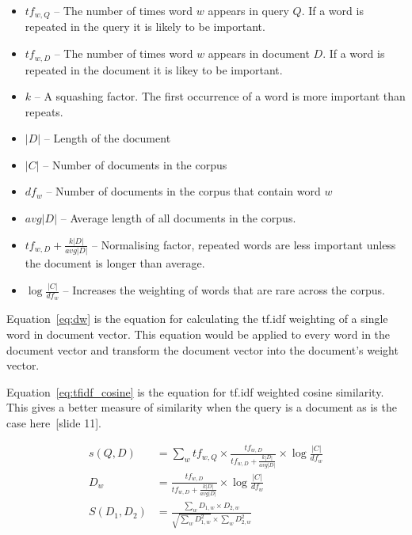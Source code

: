 \begin{itemize}
    \item $tf_{w,Q}$ -- The number of times word $w$ appears in query $Q$.  If a word is repeated in the query it is likely to be important.
    \item $tf_{w,D}$ -- The number of times word $w$ appears in document $D$.  If a word is repeated in the document it is likey to be important.
    \item $k$ -- A squashing factor.  The first occurrence of a word is more important than repeats.
    \item $|D|$ -- Length of the document
    \item $|C|$ -- Number of documents in the corpus
    \item $df_{w}$ -- Number of documents in the corpus that contain word $w$
    \item $avg|D|$ -- Average length of all documents in the corpus.
    \item $tf_{w,D} + \frac{k|D|}{avg|D|}$ -- Normalising factor, repeated words are less important unless the document is longer than average.
    \item $\log \frac{|C|}{df_{w}}$ -- Increases the weighting of words that are rare across the corpus.
\end{itemize}

Equation~\ref{eq:dw} is the equation for calculating the \ac{tf.idf} weighting of a single word in document vector.  This equation would be applied to every word in the document vector and transform the document vector into the document's weight vector.

Equation~\ref{eq:tfidf_cosine} is the equation for \ac{tf.idf} weighted cosine similarity.  This gives a better measure of similarity when the query is a document as is the case here~\cite{tts_slides}[slide 11].

\begin{subequations}
    \begin{align}
    s(Q, D) &= \sum_{w} tf_{w,Q} \times \frac{tf_{w,D}}{tf_{w,D} + \frac{k|D|}{avg|D|}} \times \log{\frac{|C|}{df_{w}}} \label{eq:tfidf}\\[6pt]
    D_{w} &= \frac{tf_{w,D}}{tf_{w,D} + \frac{k|D|}{avg|D|}} \times \log{\frac{|C|}{df_{w}}} \label{eq:dw}\\[6pt]
    S(D_{1}, D_{2}) &= \frac{\sum_{w} D_{1,w} \times D_{2,w}}{\sqrt{\sum_{w} D_{1,w}^2} \times \sum_{w} D_{2,w}^2} \label{eq:tfidf_cosine}
    \end{align}
\end{subequations}

